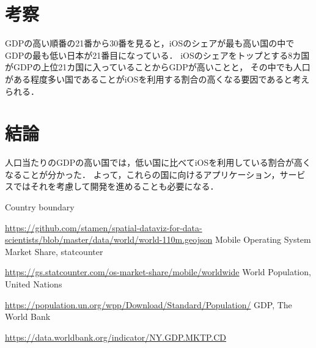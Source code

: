 \documentclass[12pt, a4paper]{jarticle}
\begin{document}

\section{考察}
GDPの高い順番の21番から30番を見ると，iOSのシェアが最も高い国の中でGDPの最も低い日本が21番目になっている．
iOSのシェアをトップとする8カ国がGDPの上位21カ国に入っていることからGDPが高いことと，
その中でも人口がある程度多い国であることがiOSを利用する割合の高くなる要因であると考えられる．

\section{結論}
人口当たりのGDPの高い国では，低い国に比べてiOSを利用している割合が高くなることが分かった．
よって，これらの国に向けるアプリケーション，サービスではそれを考慮して開発を進めることも必要になる．

\begin{thebibliography}{}
   Country boundary

  \url{https://github.com/stamen/spatial-dataviz-for-data-scientists/blob/master/data/world/world-110m.geojson}
   Mobile Operating System Market Share, statcounter
  
  \url{https://gs.statcounter.com/os-market-share/mobile/worldwide}
   World Population, United Nations

  \url{https://population.un.org/wpp/Download/Standard/Population/}
   GDP, The World Bank
  
  \url{https://data.worldbank.org/indicator/NY.GDP.MKTP.CD}
\end{thebibliography}
\end{document}
